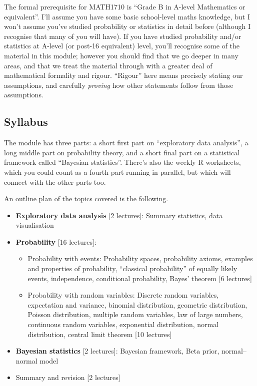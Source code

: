 \documentclass[
  a4paper,
]{book}
\providecommand{\tightlist}{%
  \setlength{\itemsep}{0pt}\setlength{\parskip}{0pt}}
\theoremstyle{definition}
\theoremstyle{definition}
\theoremstyle{definition}
\theoremstyle{definition}
\theoremstyle{remark}
\begin{document}
The formal prerequisite for MATH1710 is ``Grade B in A-level Mathematics or equivalent''. I'll assume you have some basic school-level maths knowledge, but I won't assume you've studied probability or statistics in detail before (although I recognise that many of you will have). If you have studied probability and/or statistics at A-level (or post-16 equivalent) level, you'll recognise some of the material in this module; however you should find that we go deeper in many areas, and that we treat the material through with a greater deal of mathematical formality and rigour. ``Rigour'' here means precisely stating our assumptions, and carefully \emph{proving} how other statements follow from those assumptions.

\hypertarget{syllabus}{%
\subsection*{Syllabus}\label{syllabus}}

The module has three parts: a short first part on ``exploratory data analysis'', a long middle part on probability theory, and a short final part on a statistical framework called ``Bayesian statistics''. There's also the weekly R worksheets, which you could count as a fourth part running in parallel, but which will connect with the other parts too.

An outline plan of the topics covered is the following.

\begin{itemize}
\tightlist
\item
  \textbf{Exploratory data analysis} {[}2 lectures{]}: Summary statistics, data visualisation
\item
  \textbf{Probability} {[}16 lectures{]}:

  \begin{itemize}
  \tightlist
  \item
    Probability with events: Probability spaces, probability axioms, examples and properties of probability, ``classical probability'' of equally likely events, independence, conditional probability, Bayes' theorem {[}6 lectures{]}
  \item
    Probability with random variables: Discrete random variables, expectation and variance, binomial distribution, geometric distribution, Poisson distribution, multiple random variables, law of large numbers, continuous random variables, exponential distribution, normal distribution, central limit theorem {[}10 lectures{]}
  \end{itemize}
\item
  \textbf{Bayesian statistics} {[}2 lectures{]}: Bayesian framework, Beta prior, normal--normal model
\item
  Summary and revision {[}2 lectures{]}
\end{itemize}
\end{document}
